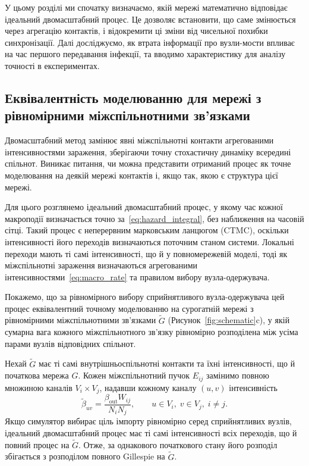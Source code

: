 У цьому розділі ми спочатку визначаємо, якій мережі математично відповідає ідеальний двомасштабний процес. Це дозволяє встановити, що саме змінюється через агрегацію контактів, і відокремити ці зміни від чисельної похибки синхронізації. Далі досліджуємо, як втрата інформації про вузли-мости впливає на час першого передавання інфекції, та вводимо характеристику для аналізу точності в експериментах.



\subsection{Еквівалентність моделюванню для мережі з рівномірними міжспільнотними зв’язками}
\label{sec:surrogate}

Двомасштабний метод замінює явні міжспільнотні контакти агрегованими інтенсивностями зараження, зберігаючи точну стохастичну динаміку всередині спільнот. Виникає питання, чи можна представити отриманий процес як точне моделювання на деякій мережі контактів і, якщо так, якою є структура цієї мережі.

Для цього розглянемо ідеальний двомасштабний процес, у якому час кожної макроподії визначається точно за~\eqref{eq:hazard_integral}, без наближення на часовій сітці. Такий процес є неперервним марковським ланцюгом (CTMC), оскільки інтенсивності його переходів визначаються поточним станом системи. Локальні переходи мають ті самі інтенсивності, що й у повномережевій моделі, тоді як міжспільнотні зараження визначаються агрегованими інтенсивностями~\eqref{eq:macro_rate} та правилом вибору вузла-одержувача.

Покажемо, що за рівномірного вибору сприйнятливого вузла-одержувача цей процес еквівалентний точному моделюванню на сурогатній мережі з рівномірними міжспільнотними зв'язками $\tilde G$ (Рисунок~\ref{fig:schematic}c), у якій сумарна вага кожного міжспільнотного зв'язку рівномірно розподілена між усіма парами вузлів відповідних спільнот.

\begin{proposition}
\label{prop:surrogate}
Нехай $\tilde G$ має ті самі внутрішньоспільнотні контакти та їхні інтенсивності, що й початкова мережа $G$. Кожен міжспільнотний пучок $E_{ij}$ замінимо повною множиною каналів $V_i\times V_j$, надавши кожному каналу $(u,v)$ інтенсивність
\[
\tilde\beta_{uv}
=
\frac{\beta_{\mathrm{out}}W_{ij}}{N_iN_j},
\qquad u\in V_i,\;v\in V_j,\;i\neq j.
\]
Якщо симулятор вибирає ціль імпорту рівномірно серед сприйнятливих вузлів, ідеальний двомасштабний процес має ті самі інтенсивності всіх переходів, що й повний процес на $\tilde G$. Отже, за однакового початкового стану його розподіл збігається з розподілом повного Gillespie на $\tilde G$.
\end{proposition}

